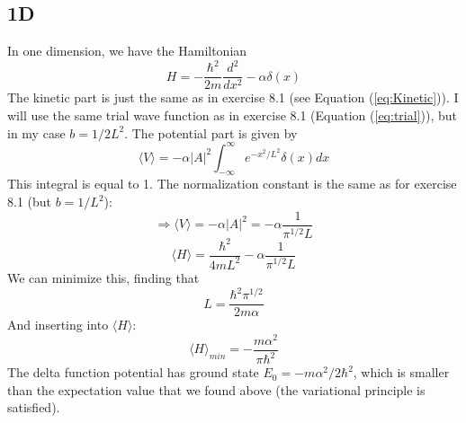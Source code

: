 \documentclass{scrartcl}
\begin{document}
\subsection*{1D}
In one dimension, we have the Hamiltonian 
\begin{equation}
H=-\frac{\hbar^2}{2m}\frac{d^2}{dx^2}-\alpha\delta(x)
\end{equation}
The kinetic part is just the same as in exercise 8.1 (see Equation (\ref{eq:Kinetic})). I will use the same trial wave function as in exercise 8.1 (Equation (\ref{eq:trial})), but in my case $b=1/2L^2$.  The potential part is given by
\begin{equation*}
\langle V\rangle=-\alpha|A|^2\int_{-\infty}^{\infty}e^{-x^2/L^2}\delta(x)dx
\end{equation*}
This integral is equal to 1. The normalization constant is the same as for exercise 8.1 (but $b=1/L^2$):
\begin{equation}
\Rightarrow \langle V\rangle = -\alpha|A|^2 = -\alpha\frac{1}{\pi^{1/2}L}
\end{equation}
\begin{equation}
\langle H\rangle = \frac{\hbar^2}{4mL^2}-\alpha\frac{1}{\pi^{1/2}L}
\end{equation}
We can minimize this, finding that
\begin{equation}
L=\frac{\hbar^2\pi^{1/2}}{2m\alpha}
\end{equation}
And inserting into $\langle H\rangle$:
\begin{equation}
\langle H\rangle_{min}=-\frac{m\alpha^2}{\pi\hbar^2}
\end{equation}
The delta function potential has ground state $E_0=-m\alpha^2/2\hbar^2$, which is smaller than the expectation value that we found above (the variational principle is satisfied). 
\end{document}
